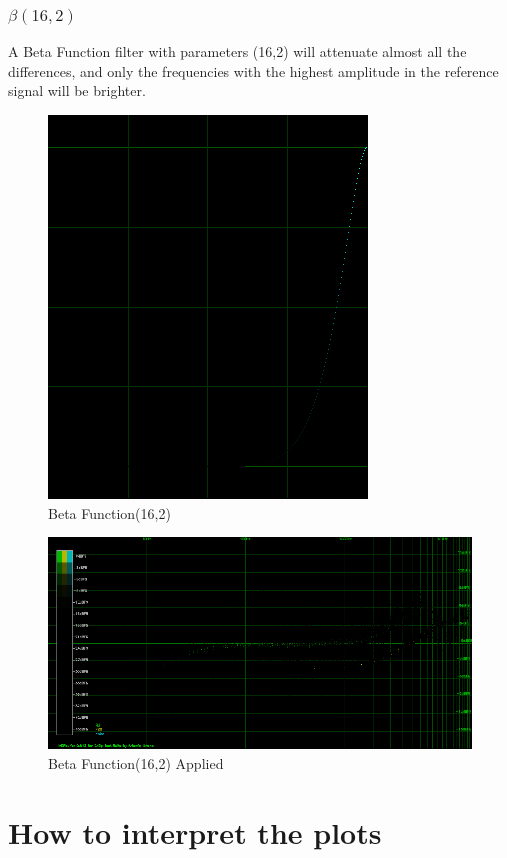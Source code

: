 \documentclass[10pt,a4paper]{report}
\begin{document}
\newpage
\subsection{$\beta(16,2)$} 

A Beta Function filter with parameters (16,2) will attenuate almost all the differences, and only the frequencies with the highest amplitude in the reference signal will be brighter.

\begin{figure}[H]
	\centering
	\includegraphics[width=0.4\linewidth]{plots/BetaFunctionPlot_5}
	\caption[Beta Function(16,2)]{Beta Function(16,2)}
	\label{fig:betafunctionplot5}
\end{figure}

\begin{figure}[H]
	\centering
	\includegraphics[width=1\linewidth]{plots/BetaFunctionPlot_5_Data}
	\caption[Beta Function(16,2)]{Beta Function(16,2) Applied}
	\label{fig:betafunctionplot5data}
\end{figure}

\chapter{How to interpret the plots}
\label{howtoplots}
\end{document}
